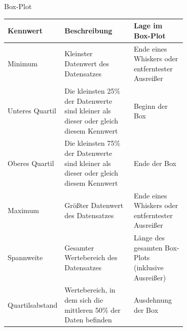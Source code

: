 \begin{defi}{Box-Plot}
    \begin{center}
        \begin{tabular}{|l|p{0.4\linewidth}|p{0.3\linewidth}|}
            \hline
            Kennwert        & Beschreibung                                                                          & Lage im Box-Plot                                   \\
            \hline
            \hline
            Minimum         & Kleinster Datenwert des Datensatzes                                                   & Ende eines Whiskers oder entferntester Ausreißer   \\
            \hline
            Unteres Quartil & Die kleinsten 25\% der Datenwerte sind kleiner als dieser oder gleich diesem Kennwert & Beginn der Box                                     \\
            \hline
            Oberes Quartil  & Die kleinsten 75\% der Datenwerte sind kleiner als dieser oder gleich diesem Kennwert & Ende der Box                                       \\
            \hline
            Maximum         & Größter Datenwert des Datensatzes                                                     & Ende eines Whiskers oder entferntester Ausreißer   \\
            \hline
            Spannweite      & Gesamter Wertebereich des Datensatzes                                                 & Länge des gesamten Box-Plots (inklusive Ausreißer) \\
            \hline
            Quartilsabstand & Wertebereich, in dem sich die mittleren 50\% der Daten befinden                       & Ausdehnung der Box                                 \\
            \hline
        \end{tabular}
    \end{center}
\end{defi}

